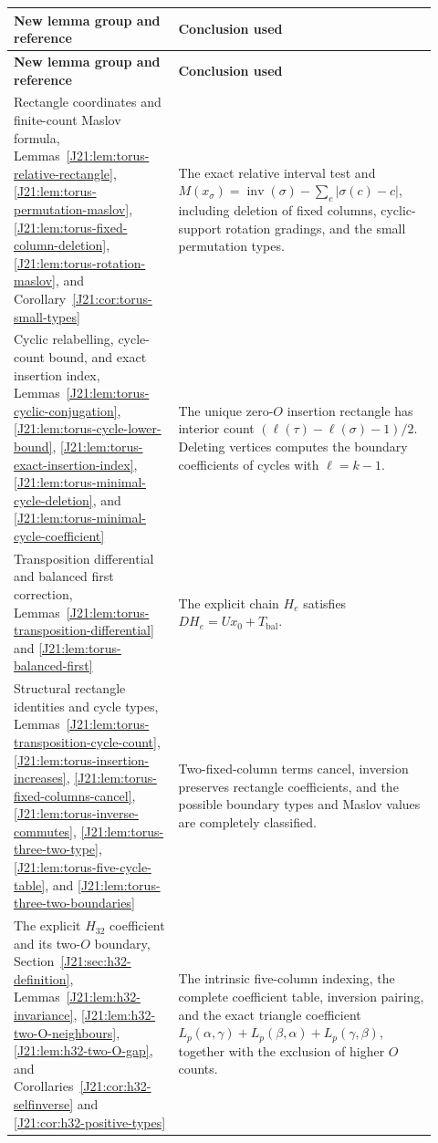 \documentclass[11pt,oneside]{report}
\theoremstyle{definition}
\numberwithin{equation}{section}
\begin{document}
\begingroup
\small
\renewcommand{\arraystretch}{1.14}
\begin{longtable}{@{}>{\raggedright\arraybackslash}p{0.35\linewidth}
>{\raggedright\arraybackslash}p{0.57\linewidth}@{}}
\textbf{New lemma group and reference}&\textbf{Conclusion used}\\\hline
\endfirsthead
\textbf{New lemma group and reference}&\textbf{Conclusion used}\\\hline
\endhead

Rectangle coordinates and finite-count Maslov formula,
Lemmas~\ref{J21:lem:torus-relative-rectangle},
\ref{J21:lem:torus-permutation-maslov},
\ref{J21:lem:torus-fixed-column-deletion},
\ref{J21:lem:torus-rotation-maslov}, and
Corollary~\ref{J21:cor:torus-small-types}
&The exact relative interval test and
$M(x_\sigma)=\operatorname{inv}(\sigma)-\sum_c|\sigma(c)-c|$,
including deletion of fixed columns, cyclic-support rotation
gradings, and the small permutation types.\\[3pt]

Cyclic relabelling, cycle-count bound, and exact insertion index,
Lemmas~\ref{J21:lem:torus-cyclic-conjugation},
\ref{J21:lem:torus-cycle-lower-bound},
\ref{J21:lem:torus-exact-insertion-index},
\ref{J21:lem:torus-minimal-cycle-deletion}, and
\ref{J21:lem:torus-minimal-cycle-coefficient}
&The unique zero-$O$ insertion rectangle has interior count
$(\ell(\tau)-\ell(\sigma)-1)/2$. Deleting vertices computes the
boundary coefficients of cycles with $\ell=k-1$.\\[3pt]

Transposition differential and balanced first correction,
Lemmas~\ref{J21:lem:torus-transposition-differential} and
\ref{J21:lem:torus-balanced-first}
&The explicit chain $H_e$ satisfies $DH_e=Ux_0+T_{\mathrm{bal}}$.\\[3pt]

Structural rectangle identities and cycle types,
Lemmas~\ref{J21:lem:torus-transposition-cycle-count},
\ref{J21:lem:torus-insertion-increases},
\ref{J21:lem:torus-fixed-columns-cancel},
\ref{J21:lem:torus-inverse-commutes},
\ref{J21:lem:torus-three-two-type},
\ref{J21:lem:torus-five-cycle-table}, and
\ref{J21:lem:torus-three-two-boundaries}
&Two-fixed-column terms cancel, inversion preserves rectangle
coefficients, and the possible boundary types and Maslov values
are completely classified.\\[3pt]

The explicit $H_{32}$ coefficient and its two-$O$ boundary,
Section~\ref{J21:sec:h32-definition},
Lemmas~\ref{J21:lem:h32-invariance},
\ref{J21:lem:h32-two-O-neighbours},
\ref{J21:lem:h32-two-O-gap}, and
Corollaries~\ref{J21:cor:h32-selfinverse} and
\ref{J21:cor:h32-positive-types}
&The intrinsic five-column indexing, the complete coefficient
table, inversion pairing, and the exact triangle coefficient
$L_p(\alpha,\gamma)+L_p(\beta,\alpha)+L_p(\gamma,\beta)$,
together with the exclusion of higher $O$ counts.\\[3pt]


\end{longtable}
\end{document}
